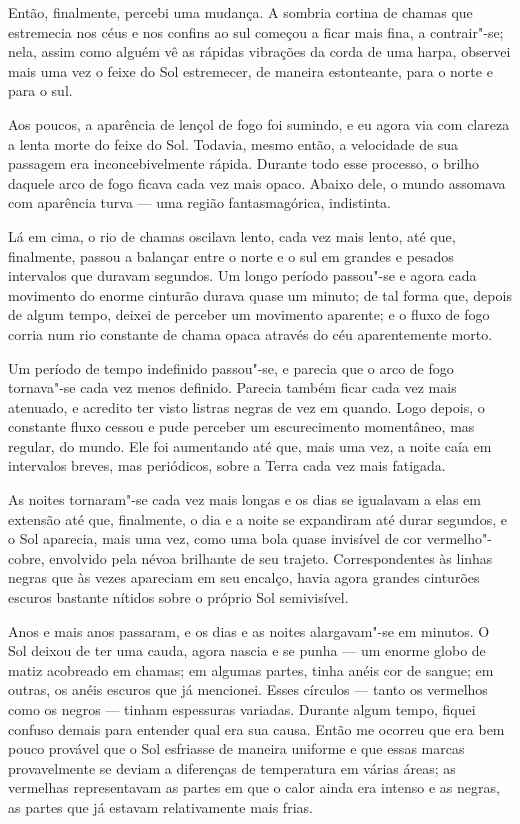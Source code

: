 Então, finalmente, percebi uma mudança. A sombria cortina de chamas que estremecia nos céus e nos confins ao sul
começou a ficar mais fina, a contrair"-se; nela, assim como alguém vê as rápidas vibrações da corda de uma harpa, observei
mais uma vez o feixe do Sol estremecer, de maneira estonteante, para o norte e para o sul.

Aos poucos, a aparência de lençol de fogo foi sumindo, e eu agora via com clareza a lenta morte do feixe do Sol.
Todavia, mesmo então, a velocidade de sua passagem era inconcebivelmente rápida. Durante todo esse processo, o brilho
daquele arco de fogo ficava cada vez mais opaco. Abaixo dele, o mundo assomava com aparência turva --- uma região
fantasmagórica, indistinta.

Lá em cima, o rio de chamas oscilava lento, cada vez mais lento, até que, finalmente, passou a balançar entre o norte e
o sul em grandes e pesados intervalos que duravam segundos. Um longo período passou"-se e agora cada movimento do
enorme cinturão durava quase um minuto; de tal forma que, depois de algum tempo, deixei de perceber um movimento
aparente; e o fluxo de fogo corria num rio constante de chama opaca através do céu aparentemente morto.

Um período de tempo indefinido passou"-se, e parecia que o arco de fogo tornava"-se cada vez menos definido. Parecia
também ficar cada vez mais atenuado, e acredito ter visto listras negras de vez em quando. Logo depois, o constante fluxo
cessou e pude perceber um escurecimento momentâneo, mas regular, do mundo. Ele foi aumentando até que, mais uma vez, a
noite caía em intervalos breves, mas periódicos, sobre a Terra cada vez mais fatigada. 

As noites tornaram"-se cada vez mais longas e os dias se igualavam a elas em extensão até que, finalmente, o dia e a
noite se expandiram até durar segundos, e o Sol aparecia, mais uma vez, como uma bola quase invisível de cor
vermelho"-cobre, envolvido pela névoa brilhante de seu trajeto. Correspondentes às linhas negras que às vezes apareciam
em seu encalço, havia agora grandes cinturões escuros bastante nítidos sobre o próprio Sol semivisível.

Anos e mais anos passaram, e os dias e as noites alargavam"-se em minutos. O Sol deixou de ter uma cauda, agora nascia
e se punha --- um enorme globo de matiz acobreado em chamas; em algumas partes, tinha anéis cor de sangue; em outras, os
anéis escuros que já mencionei. Esses círculos --- tanto os vermelhos como os negros --- tinham espessuras variadas.
Durante algum tempo, fiquei confuso demais para entender qual era sua causa. Então me ocorreu que era bem pouco
provável que o Sol esfriasse de maneira uniforme e que essas marcas provavelmente se deviam a diferenças de
temperatura em várias áreas; as vermelhas representavam as partes em que o calor ainda era intenso e as negras,
as partes que já estavam relativamente mais frias.

